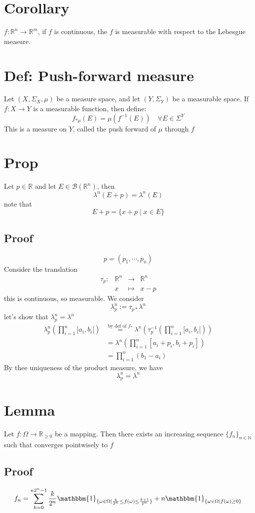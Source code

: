 \documentclass{book}
\newcommand{\leftbracket}{[}
\newcommand{\rightbracket}{]}
\begin{document}
\section{Corollary}
$f:\mathbb{R}^n\rightarrow\mathbb{R}^m$, if $f$ is continuous, the $f$ is measurable with respect to the Lebesgue measure.
\section{Def: Push-forward measure}
Let $(X,\Sigma_X,\mu)$ be a measure space, and let $(Y,\Sigma_Y)$ be a measurable space. If $f:X\rightarrow Y$ is a measurable function, then define:
$$f_{*\mu}(E)=\mu(f^{-1}(E))\quad \forall E\in \Sigma^Y$$
This is a measure on $Y$, called the push forward of $\mu$ through $f$
\section{Prop}
Let $p\in \mathbb{R}$ and let $E\in \mathscr{B}(\mathbb{R}^n)$, then $$\lambda^n(E+p)=\lambda^n(E)$$
note that
$$E+p=\{x+p\mid x\in E\}$$
\subsection*{Proof}
$$p=(p_1,\cdots,p_n)$$ Consider the translation
$$\begin{aligned}
    \tau_p: &\mathbb{R}^n&\rightarrow&\mathbb{R}^n\\ &x&\mapsto&x-p
\end{aligned}$$
this is continuous, so measurable. We consider$$\lambda^n_p:=\tau_{p*}\lambda^n$$
let's show that $\lambda^n_p=\lambda^n$
$$
\begin{aligned}
    \lambda^n_p(\prod\limits_{i=1}^n\leftbracket a_i,b_i\leftbracket) &\stackrel{\text{by def of }f_* }{=}\lambda^n(\tau_p^{-1}(\prod\limits_{i=1}^n\leftbracket a_i,b_i\leftbracket))\\
    &=\lambda^n(\prod\limits_{i=1}^n\leftbracket a_i+p_i,b_i+p_i\rightbracket)\\
    &=\prod\limits_{i=1}^n(b_1-a_i)
\end{aligned}$$
By thee uniqueness of the product measure, we have $$\lambda^n_p=\lambda^n$$
\section{Lemma}
\label{Lemma 53.23}
Let $f:\Omega\rightarrow\mathbb{R}_{\geq0}$ be a mapping. Then there exists an increasing sequence $\{f_n\}_{n\in \mathbb{N}}$ such that converges pointwisely to $f$
\subsection*{Proof}
$$f_n=\sum\limits_{k=0}^{n2^n-1}\frac{k}{2^n}\mathbbm{1}_{\{\omega\in \Omega\mid \frac{k}{2^n}\leq f(\omega)\leq \frac{k+1}{2^n}\}}+n\mathbbm{1}_{\{\omega\in \Omega\mid f(\omega)\geq 0\}}$$
\end{document}
